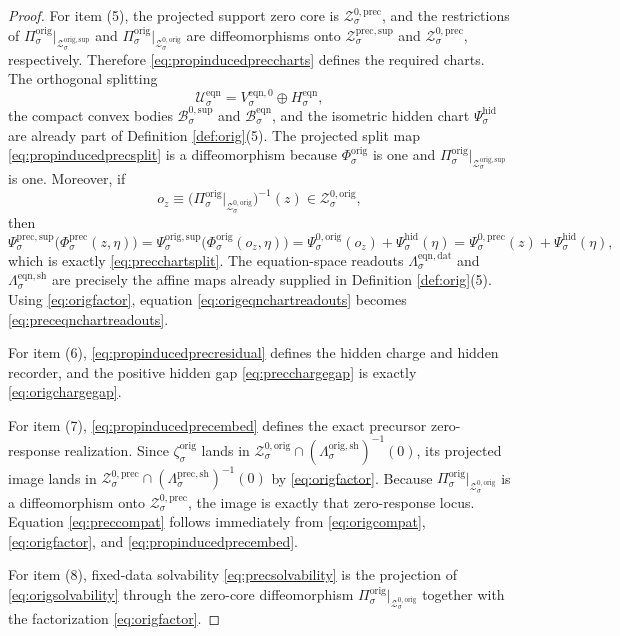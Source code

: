 \documentclass[11pt]{article}
\newcommand{\EqnSpace}[1]{\mathcal U_{#1}^{\mathrm{eqn}}}
\newcommand{\EqnBody}[1]{\mathcal B_{#1}^{\mathrm{eqn}}}
\newcommand{\EqnData}[1]{\Lambda_{#1}^{\mathrm{eqn,dat}}}
\newcommand{\EqnShell}[1]{\Lambda_{#1}^{\mathrm{eqn,sh}}}
\newcommand{\EqnHidden}[1]{H_{#1}^{\mathrm{eqn}}}
\newcommand{\EqnZero}[1]{V_{#1}^{\mathrm{eqn},0}}
\newcommand{\HiddenChart}[1]{\Psi_{#1}^{\mathrm{hid}}}
\newcommand{\ZeroBody}[1]{\mathcal B_{#1}^{0,\mathrm{sup}}}
\newcommand{\PrecShellMap}[1]{\Lambda_{#1}^{\mathrm{prec,sh}}}
\newcommand{\PrecSupportShell}[1]{\mathcal Z_{#1}^{\mathrm{prec,sup}}}
\newcommand{\PrecZeroCore}[1]{\mathcal Z_{#1}^{0,\mathrm{prec}}}
\newcommand{\PrecEqChart}[1]{\Psi_{#1}^{\mathrm{prec,sup}}}
\newcommand{\PrecZeroChart}[1]{\Psi_{#1}^{0,\mathrm{prec}}}
\newcommand{\PrecSplit}[1]{\Phi_{#1}^{\mathrm{prec}}}
\newcommand{\OrigProj}[1]{\Pi_{#1}^{\mathrm{orig}}}
\newcommand{\OrigShellMap}[1]{\Lambda_{#1}^{\mathrm{orig,sh}}}
\newcommand{\OrigSupportShell}[1]{\mathcal Z_{#1}^{\mathrm{orig,sup}}}
\newcommand{\OrigZeroCore}[1]{\mathcal Z_{#1}^{0,\mathrm{orig}}}
\newcommand{\OrigEqChart}[1]{\Psi_{#1}^{\mathrm{orig,sup}}}
\newcommand{\OrigZeroChart}[1]{\Psi_{#1}^{0,\mathrm{orig}}}
\newcommand{\OrigSplit}[1]{\Phi_{#1}^{\mathrm{orig}}}
\newcommand{\OrigEmbed}[1]{\zeta_{#1}^{\mathrm{orig}}}
\begin{document}
\begin{proof}
For item (5), the projected support zero core is \(\PrecZeroCore{\sigma}\), and the restrictions of \(\OrigProj{\sigma}\big|_{\OrigSupportShell{\sigma}}\) and \(\OrigProj{\sigma}\big|_{\OrigZeroCore{\sigma}}\) are diffeomorphisms onto \(\PrecSupportShell{\sigma}\) and \(\PrecZeroCore{\sigma}\), respectively. Therefore \eqref{eq:propinducedpreccharts} defines the required charts. The orthogonal splitting
\[
\EqnSpace{\sigma}=\EqnZero{\sigma}\oplus\EqnHidden{\sigma},
\]
the compact convex bodies \(\ZeroBody{\sigma}\) and \(\EqnBody{\sigma}\), and the isometric hidden chart \(\HiddenChart{\sigma}\) are already part of Definition \ref{def:orig}(5). The projected split map \eqref{eq:propinducedprecsplit} is a diffeomorphism because \(\OrigSplit{\sigma}\) is one and \(\OrigProj{\sigma}\big|_{\OrigSupportShell{\sigma}}\) is one. Moreover, if
\[
o_{z}
\equiv
\bigl(\OrigProj{\sigma}\big|_{\OrigZeroCore{\sigma}}\bigr)^{-1}(z)
\in
\OrigZeroCore{\sigma},
\]
then
\[
\PrecEqChart{\sigma}\bigl(\PrecSplit{\sigma}(z,\eta)\bigr)
=
\OrigEqChart{\sigma}\bigl(\OrigSplit{\sigma}(o_{z},\eta)\bigr)
=
\OrigZeroChart{\sigma}(o_{z})+\HiddenChart{\sigma}(\eta)
=
\PrecZeroChart{\sigma}(z)+\HiddenChart{\sigma}(\eta),
\]
which is exactly \eqref{eq:precchartsplit}. The equation-space readouts \(\EqnData{\sigma}\) and \(\EqnShell{\sigma}\) are precisely the affine maps already supplied in Definition \ref{def:orig}(5). Using \eqref{eq:origfactor}, equation \eqref{eq:origeqnchartreadouts} becomes \eqref{eq:preceqnchartreadouts}.

For item (6), \eqref{eq:propinducedprecresidual} defines the hidden charge and hidden recorder, and the positive hidden gap \eqref{eq:precchargegap} is exactly \eqref{eq:origchargegap}.

For item (7), \eqref{eq:propinducedprecembed} defines the exact precursor zero-response realization. Since \(\OrigEmbed{\sigma}\) lands in \(\OrigZeroCore{\sigma}\cap(\OrigShellMap{\sigma})^{-1}(0)\), its projected image lands in \(\PrecZeroCore{\sigma}\cap(\PrecShellMap{\sigma})^{-1}(0)\) by \eqref{eq:origfactor}. Because \(\OrigProj{\sigma}\big|_{\OrigZeroCore{\sigma}}\) is a diffeomorphism onto \(\PrecZeroCore{\sigma}\), the image is exactly that zero-response locus. Equation \eqref{eq:preccompat} follows immediately from \eqref{eq:origcompat}, \eqref{eq:origfactor}, and \eqref{eq:propinducedprecembed}.

For item (8), fixed-data solvability \eqref{eq:precsolvability} is the projection of \eqref{eq:origsolvability} through the zero-core diffeomorphism \(\OrigProj{\sigma}\big|_{\OrigZeroCore{\sigma}}\) together with the factorization \eqref{eq:origfactor}.


\end{proof}
\end{document}
